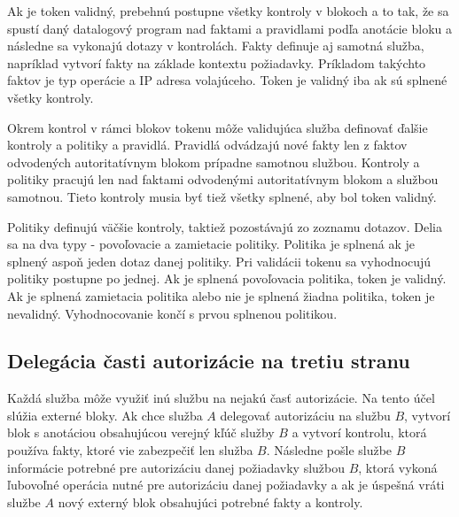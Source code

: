 Ak je token validný, prebehnú postupne všetky kontroly v blokoch a to tak, že sa spustí daný datalogový program nad faktami a pravidlami podľa anotácie bloku a následne sa vykonajú dotazy v kontrolách. Fakty definuje aj samotná služba, napríklad vytvorí fakty na základe kontextu požiadavky. Príkladom takýchto faktov je typ operácie a IP adresa volajúceho. Token je validný iba ak sú splnené všetky kontroly. 

Okrem kontrol v rámci blokov tokenu môže validujúca služba definovať ďalšie kontroly a politiky a pravidlá. Pravidlá odvádzajú nové fakty len z faktov odvodených autoritatívnym blokom prípadne samotnou službou. Kontroly a politiky pracujú len nad faktami odvodenými autoritatívnym blokom a službou samotnou. Tieto kontroly musia byť tiež všetky splnené, aby bol token validný.

Politiky definujú väčšie kontroly, taktiež pozostávajú zo zoznamu dotazov. Delia sa na dva typy - povoľovacie a zamietacie politiky. Politika je splnená ak je splnený aspoň jeden dotaz danej politiky. Pri validácii tokenu sa vyhodnocujú politiky postupne po jednej. Ak je splnená povoľovacia politika, token je validný. Ak je splnená zamietacia politika alebo nie je splnená žiadna politika, token je nevalidný. Vyhodnocovanie končí s prvou splnenou politikou.

\subsection{Delegácia časti autorizácie na tretiu stranu}

Každá služba môže využiť inú službu na nejakú časť autorizácie. Na tento účel slúžia externé bloky. Ak chce služba $A$ delegovať autorizáciu na službu $B$, vytvorí blok s anotáciou obsahujúcou verejný kľúč služby $B$ a vytvorí kontrolu, ktorá používa fakty, ktoré vie zabezpečiť len služba $B$. Následne pošle službe $B$ informácie potrebné pre autorizáciu danej požiadavky službou $B$, ktorá vykoná ľubovoľné operácia nutné pre autorizáciu danej požiadavky a ak je úspešná vráti službe $A$ nový externý blok obsahujúci potrebné fakty a kontroly. 